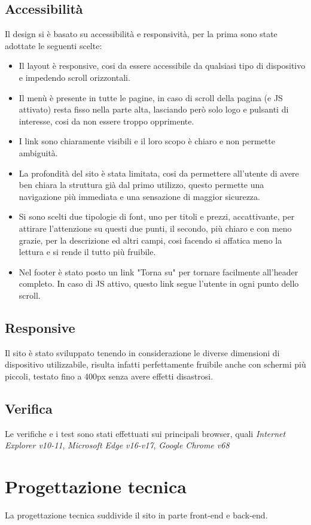 \subsection{Accessibilità}
Il design si è basato su accessibilità e responsività, per la prima sono state adottate le seguenti scelte:
\begin{itemize}
	\item Il layout è responsive, cosi da essere accessibile da qualsiasi tipo di dispositivo e impedendo scroll orizzontali.
	\item Il menù è presente in tutte le pagine, in caso di scroll della pagina (e JS attivato) resta fisso nella parte alta, lasciando però solo logo e pulsanti di interesse, cosi da non essere troppo opprimente.
	\item I link sono chiaramente visibili e il loro scopo è chiaro e non permette ambiguità.
	\item La profondità del sito è stata limitata, cosi da permettere all'utente di avere ben chiara la struttura già dal primo utilizzo, questo permette una navigazione più immediata e una sensazione di maggior sicurezza.
	\item Si sono scelti due tipologie di font, uno per titoli e prezzi, accattivante, per attirare l'attenzione su questi due punti, il secondo, più chiaro e con meno grazie, per la descrizione ed altri campi, cosi facendo si affatica meno la lettura e si rende il tutto più fruibile.
	\item Nel footer è stato posto un link "Torna su" per tornare facilmente all'header completo. In caso di JS attivo, questo link segue l'utente in ogni punto dello scroll. 
\end{itemize}
\subsection{Responsive}

Il sito è stato sviluppato tenendo in considerazione le diverse dimensioni di dispositivo utilizzabile, risulta infatti perfettamente fruibile anche con schermi più piccoli, testato fino a 400px senza avere effetti disastrosi.

\subsection{Verifica}
Le verifiche e i test sono stati effettuati sui principali browser, quali \textit{Internet Explorer v10-11}, \textit{Microsoft Edge v16-v17},  \textit{Google Chrome v68}
\section{Progettazione tecnica}
La progettazione tecnica suddivide il sito in parte front-end e back-end.
